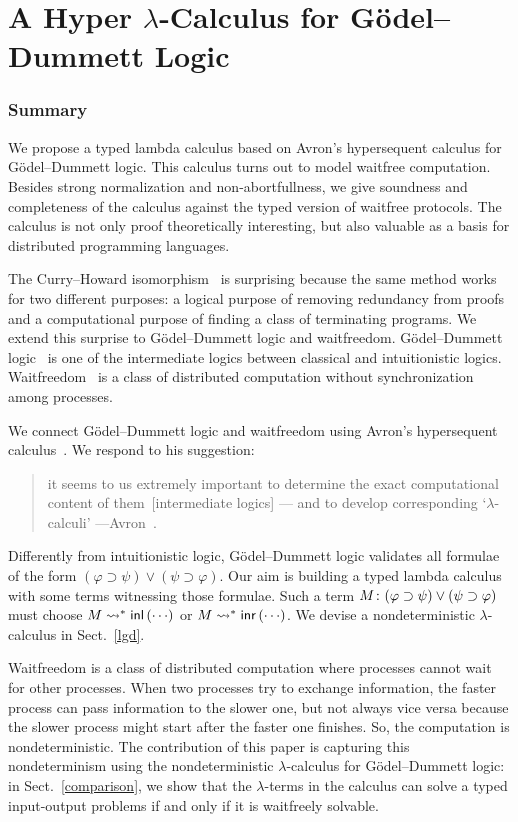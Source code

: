 \chapter{A Hyper $\lambda$-Calculus for G\"odel--Dummett Logic}

\subsection{Summary}

We propose a typed lambda calculus based on Avron's hypersequent
calculus for G\"odel--Dummett logic.  This calculus turns out to model
waitfree computation.
Besides strong normalization and non-abortfullness, 
we give soundness and completeness of
the calculus against the typed version of waitfree protocols.
The calculus is not only proof theoretically interesting,
but also valuable as a basis for distributed programming languages.

The Curry--Howard isomorphism~\cite{curryhoward} is surprising because the same
method works for two different purposes: a logical purpose of
removing redundancy from proofs and a computational purpose of finding a
class of terminating programs.
We extend
this surprise to G\"odel--Dummett logic and
waitfreedom.
G\"odel--Dummett logic~\cite{dummett59}
is one of the intermediate logics
between classical and intuitionistic logics.
Waitfreedom~\cite{Herlihy88,Saks:1993vq} is a class of distributed
computation without synchronization among processes.

We connect G\"odel--Dummett logic and waitfreedom using
Avron's hypersequent calculus~\cite{avron91}.
We respond to his suggestion:
\begin{quote}
it seems to us extremely important to determine the exact
       computational content of them~[intermediate logics] ---
       and {to develop corresponding `$\lambda$-calculi'}
       ---Avron~\cite{avron91}. 
\end{quote}
Differently from intuitionistic logic, G\"odel--Dummett logic validates
all formulae of the form
 $(\varphi\supset\psi)\vee(\psi\supset\varphi)$.
Our aim is building a typed lambda calculus
with some terms witnessing those formulae.
Such a term
${M} \colon{(\varphi\supset\psi)\vee(\psi\supset\varphi)}$ must choose 
$M\rightsquigarrow^\ast \mathsf{inl}\left({\cdots}\right)$ or $M\rightsquigarrow^\ast \mathsf{inr}\left({\cdots}\right)$.
We devise a nondeterministic $\lambda$-calculus in Sect.~\ref{lgd}.

Waitfreedom is a class of distributed computation where
processes cannot wait for other processes.  When two processes try to
exchange information, the faster process can pass information to the
slower one, but not always vice versa because the slower process might
start after the faster one finishes.
So, the computation is nondeterministic.
The contribution of this paper is capturing
this nondeterminism using the nondeterministic $\lambda$-calculus for
G\"odel--Dummett logic: in Sect.~\ref{comparison}, we show that the
$\lambda$-terms in the calculus can solve a typed input-output
problems if and only if it is waitfreely solvable.

